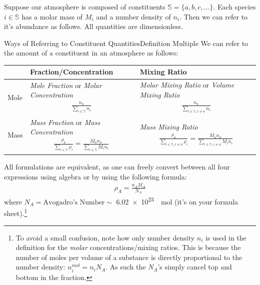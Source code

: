 Suppose our atmosphere is composed of constituents  $\mathbb{S}=\{a,b,c,\ldots\}$. Each species $i\in\mathbb{S}$ has a molar mass of $M_i$ and a number density of $n_i$. Then we can refer to it's abundance as follows. All quantities are dimensionless.

\begin{fact}{Ways of Referring to Constituent Quantities}{Definition Multiple}\label{Definition Multiple}
    We can refer to the amount of a constituent in an atmosphere as follows: 

    \noindent\begin{tabular}{|p{0.8cm}|p{6.5cm}|p{7.5cm}|}
        \hline
        & Fraction/Concentration & Mixing Ratio \\
        \hline
        Mole & \textit{Mole Fraction} or \textit{Molar Concentration} \begin{align*}
            \frac{n_a}{\sum\limits_{i\in\mathbb{S}} n_i}
        \end{align*} & \textit{Molar Mixing Ratio} or \textit{Volume Mixing Ratio} \begin{align*}
            \frac{n_a}{\sum\limits_{i\in\mathbb{S},i\neq a} n_i}
        \end{align*}
        \\
        \hline
        Mass & \textit{Mass Fraction} or \textit{Mass Concentration} \begin{align*}
            \frac{\rho_a}{\sum\limits_{i\in\mathbb{S}} \rho_i}
            =
            \frac{M_an_a}{\sum\limits_{i\in\mathbb{S}} M_in_i}
        \end{align*} & \textit{Mass Mixing Ratio} \begin{align*}
            \frac{\rho_a}{\sum\limits_{i\in\mathbb{S},i\neq a} \rho_i}
            =
            \frac{M_an_a}{\sum\limits_{i\in\mathbb{S},i\neq a} M_in_i}
        \end{align*}\\
        \hline
    \end{tabular}
    
    All formulations are equivalent, as one can freely convert between all four expressions using algebra or by using the following formula:
    \begin{align}\label{density to number}
        \rho_A=\frac{n_AM_A}{N_A}
    \end{align}
    where $N_A=\text{Avogadro's Number}\sim$ \qty{6.02e23}{\per\mole} (it's on your formula sheet).\footnote{
        To avoid a small confusion, note how only number density $n_i$ is used in the definition for the \textit{molar} concentrations/mixing ratios. This is because the number of moles per volume of a substance is directly proportional to the number density: $n_i^{mol}=n_iN_A$. As such the $N_A$'s simply cancel top and bottom in the fraction.
    } 
\end{fact}


